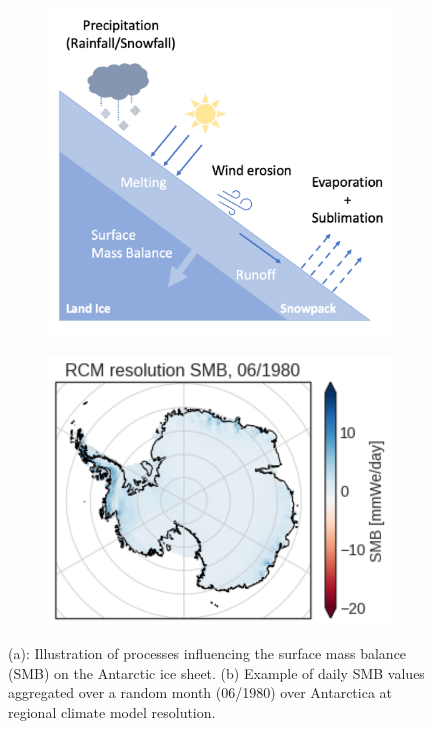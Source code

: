 \documentclass[a4paper,11pt,oneside]{report}
\begin{document}
    
    \begin{figure}[tbp]
        \centering
        \begin{subfigure}[b]{0.45\columnwidth}  
            \centering 
            \includegraphics[width=\textwidth]{doc/Thesis-latex/images/processes_smb.pdf}
            \caption[]%
            {{\small }} \label{fig:smb-processes}
        \end{subfigure}
        \hfill
        \begin{subfigure}[b]{0.45\columnwidth}
            \centering \includegraphics[width=\textwidth]{doc/Thesis-latex/images/smb-example.pdf}
            \caption[]%
            {{\small }}    
          \label{fig:example-smb}
        \end{subfigure}
        \caption[]
        {\small (a): Illustration of processes influencing the surface mass balance (SMB) on the Antarctic ice sheet. (b) Example of daily SMB values aggregated over a random month (06/1980) over Antarctica at regional climate model resolution.
        } 
        \label{fig:example-smb-and-processes}
    \end{figure}
    
\end{document}
